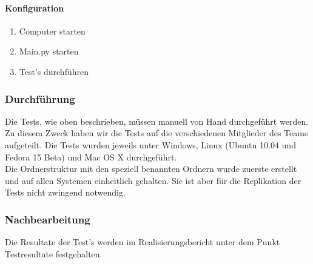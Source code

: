 \documentclass[10pt,paper=a4,final]{scrartcl}
\begin{document}
\paragraph{Konfiguration}
\begin{enumerate}
\item Computer starten
\item Main.py starten
\item Test's durchführen
\end{enumerate}
\subsubsection{Durchf\"uhrung}
Die Tests, wie oben beschrieben, m\"ussen manuell von Hand durchgef\"uhrt werden.\\
Zu diesem Zweck haben wir die Tests auf die verschiedenen Mitglieder des Teams aufgeteilt. Die Tests wurden jeweils unter Windows, Linux (Ubuntu 10.04 und Fedora 15 Beta) und Mac OS X durchgeführt.\\
Die Ordnerstruktur mit den speziell benannten Ordnern wurde zuerste erstellt und auf allen Systemen einheitlich gehalten. Sie ist aber f\"ur die Replikation der Tests nicht zwingend notwendig.
\subsubsection{Nachbearbeitung}
Die Resultate der Test's werden im Realisierungsbericht unter dem Punkt Testresultate festgehalten.
\end{document}

